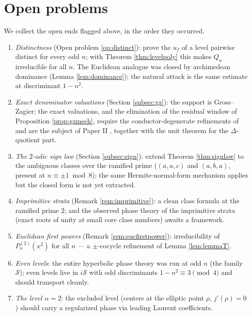 \documentclass[11pt]{amsart}
\numberwithin{equation}{section}
\theoremstyle{plain}
\theoremstyle{definition}
\theoremstyle{remark}
\newcommand{\Sarr}{\mathcal{S}}
\begin{document}
\section{Open problems}\label{sec:open}

We collect the open ends flagged above, in the order they occurred.

\begin{enumerate}
\item \emph{Distinctness} (Open problem \ref{op:distinct}): prove the
$u_f$ of a level pairwise distinct for every odd $n$; with Theorem
\ref{thm:levelpoly} this makes $Q_n$ irreducible for all $n$.  The
Euclidean analogue was closed by archimedean dominance (Lemma
\ref{lem:dominance}); the natural attack is the same estimate at
discriminant $1 - n^2$.
\item \emph{Exact denominator valuations} (Section \ref{subsec:gz}):
the support is Gross--Zagier; the exact valuations, and the
elimination of the residual window of Proposition \ref{prop:gzmech},
require the conductor-degenerate refinements of
\cite{GrossZagier1985, LauterViray2015} and are the subject of Paper
II \cite{PaperII}, together with the unit theorem for the
$\Delta$-quotient part.
\item \emph{The $2$-adic sign law} (Section \ref{subsec:sign}):
extend Theorem \ref{thm:signlaw} to the ambiguous classes over the
ramified prime ($(a, a, c)$ and $(a, b, a)$, present at $n \equiv \pm
1 \bmod 8$); the same Hermite-normal-form mechanism applies but the
closed form is not yet extracted.
\item \emph{Imprimitive strata} (Remark \ref{rem:imprimitive}): a
clean class formula at the ramified prime $2$; and the observed phase
theory of the imprimitive strata (exact roots of unity at small core
class numbers) awaits a framework.
\item \emph{Euclidean first powers} (Remark \ref{rem:eucfirstpower}):
irreducibility of $P^{(2)}_n(x^2)$ for all $n$ --- a $\pm$-cocycle
refinement of Lemma \ref{lem:lemmaT}.
\item \emph{Even levels}: the entire hyperbolic phase theory was run
at odd $n$ (the family $\Sarr$); even levels live in $i\Sarr$ with
odd discriminants $1 - n^2 \equiv 3 \pmod 4$ and should transport
cleanly.
\item \emph{The level $\alpha = 2$}: the excluded level (centers at
the elliptic point $\rho$, $j'(\rho) = 0$) should carry a regularized
phase via leading Laurent coefficients.
\end{enumerate}
\end{document}
